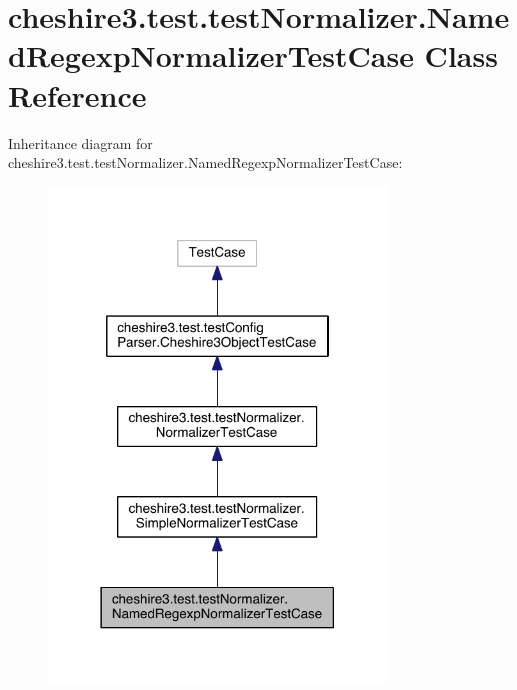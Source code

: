 \hypertarget{classcheshire3_1_1test_1_1test_normalizer_1_1_named_regexp_normalizer_test_case}{\section{cheshire3.\-test.\-test\-Normalizer.\-Named\-Regexp\-Normalizer\-Test\-Case Class Reference}
\label{classcheshire3_1_1test_1_1test_normalizer_1_1_named_regexp_normalizer_test_case}
}


Inheritance diagram for cheshire3.\-test.\-test\-Normalizer.\-Named\-Regexp\-Normalizer\-Test\-Case\-:
\nopagebreak
\begin{figure}[H]
\begin{center}
\leavevmode
\includegraphics[width=254pt]{classcheshire3_1_1test_1_1test_normalizer_1_1_named_regexp_normalizer_test_case__inherit__graph}
\end{center}
\end{figure}


